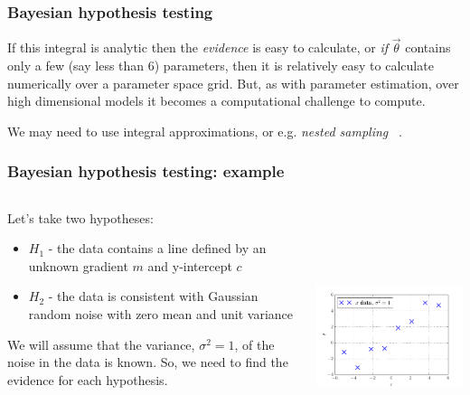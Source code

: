 \begin{frame}

\frametitle{Bayesian hypothesis testing}
\label{bayesianhypothesistesting}

If this integral is analytic then the \emph{evidence} is easy to calculate, or \emph{if} $\vec{\theta}$
contains only a few (say less than 6) parameters, then it is relatively easy to calculate
numerically over a parameter space grid. But, as with parameter estimation, over high
dimensional models it becomes a computational challenge to compute.

We may need to use integral approximations, or e.g. \emph{nested sampling} ~\citep{Skilling}.

\end{frame}

\begin{frame}

\frametitle{Bayesian hypothesis testing: example}
\label{bayesianhypothesistesting:example}

\begin{columns}
\begin{column}{0.5\textwidth}

Let's take two hypotheses:

\begin{itemize}
\item $H_1$ - the data contains a line defined by an unknown gradient $m$ and y-intercept $c$

\item $H_2$ - the data is consistent with Gaussian random noise with zero mean and unit variance

\end{itemize}

We will assume that the variance, $\sigma^2=1$, of the noise in the data is known. So, we
need to find the evidence for each hypothesis.
\end{column}
\begin{column}{0.5\textwidth}
\includegraphics[keepaspectratio,width=\textwidth,height=210pt]{figures/linear_data_2.pdf}
\end{column}
\end{columns}

\end{frame}

